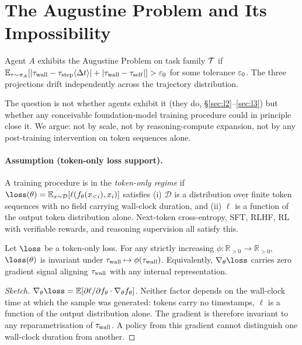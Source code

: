 
\section{The Augustine Problem and Its Impossibility}
\label{sec:augustine-problem}

\begin{definition}
\label{def:augustine-problem}
Agent $A$ exhibits the Augustine Problem on task family $\mathcal{T}$ if
$\mathbb{E}_{\tau \sim \pi_A}\!\left[|\tau_{\mathrm{wall}} - \tau_{\mathrm{step}}\langle\Delta t\rangle| + |\tau_{\mathrm{wall}} - \tau_{\mathrm{self}}|\right] > \varepsilon_0$
for some tolerance $\varepsilon_0$. The three projections drift independently across the trajectory distribution.
\end{definition}

The question is not whether agents exhibit it (they do, \S\ref{sec:l2}--\ref{sec:l3}) but whether any conceivable foundation-model training procedure could in principle close it. We argue: not by scale, not by reasoning-compute expansion, not by any post-training intervention on token sequences alone.

\paragraph{Assumption (token-only loss support).}
\label{ass:token-only}
A training procedure is in the \emph{token-only regime} if
$\loss(\theta) = \mathbb{E}_{x \sim \mathcal{D}}[\ell(f_\theta(x_{<i}), x_i)]$
satisfies (i) $\mathcal{D}$ is a distribution over finite token sequences with no field carrying wall-clock duration, and (ii) $\ell$ is a function of the output token distribution alone. Next-token cross-entropy, SFT, RLHF, RL with verifiable rewards, and reasoning supervision all satisfy this.

\begin{observation}
\label{thm:cit}
Let $\loss$ be a token-only loss. For any strictly increasing $\phi: \mathbb{R}_{>0} \to \mathbb{R}_{>0}$, $\loss(\theta)$ is invariant under $\tau_{\mathrm{wall}} \mapsto \phi(\tau_{\mathrm{wall}})$. Equivalently, $\nabla_\theta \loss$ carries zero gradient signal aligning $\tau_{\mathrm{wall}}$ with any internal representation.
\end{observation}

\begin{proof}[Sketch]
$\nabla_\theta\loss = \mathbb{E}[\partial\ell/\partial f_\theta \cdot \nabla_\theta f_\theta]$. Neither factor depends on the wall-clock time at which the sample was generated: tokens carry no timestamps, $\ell$ is a function of the output distribution alone. The gradient is therefore invariant to any reparametrisation of $\tau_{\mathrm{wall}}$. A policy from this gradient cannot distinguish one wall-clock duration from another.
\end{proof}

